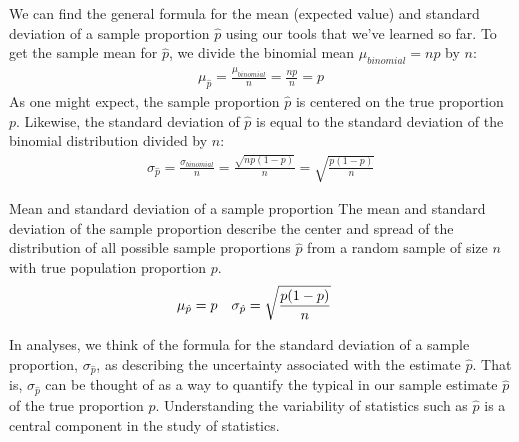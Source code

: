 We can find the general formula for the mean (expected value) and standard deviation of a sample proportion $\hat{p}$ using our tools that we've learned so far. To get the sample mean for $\hat{p}$, we divide the binomial mean $\mu_{binomial} = np$ by $n$:
\begin{align*}
\mu_{\hat{p}} = \frac{\mu_{binomial}}{n} = \frac{np}{n} = p
\end{align*}
As one might expect, the sample proportion $\hat{p}$ is centered on the true proportion $p$. Likewise, the standard deviation of $\hat{p}$ is equal to the standard deviation of the binomial distribution divided by $n$:
\begin{align*}
\sigma_{\hat{p}}
	= \frac{\sigma_{binomial}}{n}
	= \frac{\sqrt{np(1-p)}}{n}
	= \sqrt{\frac{p(1-p)}{n}}
\end{align*}

\begin{onebox}{Mean and standard deviation of a sample proportion}
The mean and standard deviation of the sample proportion describe the center and spread of the distribution of all possible sample proportions $\hat{p}$ from a random sample of size $n$ with true population proportion $p$.
\begin{align*}
\mu_{\hat{p}} &= p
	& \sigma_{\hat{p}}&= \sqrt{\frac{p(1-p)}{n}}
	\vspace{1mm}
\end{align*}\end{onebox}


In analyses, we think of the formula for the standard deviation of a sample proportion, $\sigma_{\hat{p}}$, as describing the uncertainty associated with the estimate $\hat{p}$. That is, $\sigma_{\hat{p}}$ can be thought of as a way to quantify the typical  in our sample estimate $\hat{p}$ of the true proportion $p$. Understanding the variability of statistics such as $\hat{p}$ is a central component in the study of statistics.


